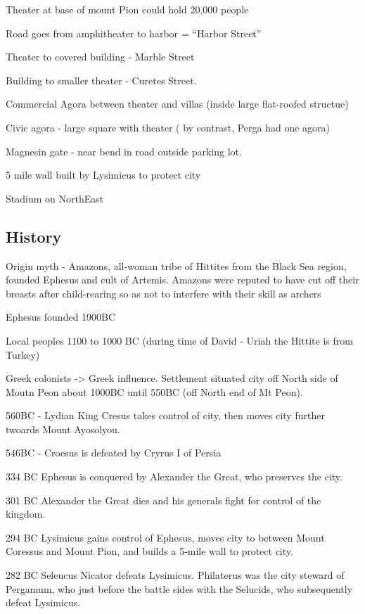 \documentclass[
]{book}
\begin{document}
Theater at base of mount Pion could hold 20,000 people

Road goes from amphitheater to harbor = ``Harbor Street''

Theater to covered building - Marble Street

Building to smaller theater - Curetes Street.

Commercial Agora between theater and villas (inside large flat-roofed structue)

Civic agora - large square with theater ( by contrast, Perga had one agora)

Magnesin gate - near bend in road outside parking lot.

5 mile wall built by Lysimicus to protect city

Stadium on NorthEast

\hypertarget{history-7}{%
\subsection{History}\label{history-7}}

Origin myth - Amazons, all-woman tribe of Hittites from the Black Sea region, founded Ephesus and cult of Artemis. Amazons were reputed to have cut off their breasts after child-rearing so as not to interfere with their skill as archers

Ephesus founded 1900BC

Local peoples 1100 to 1000 BC (during time of David - Uriah the Hittite is from Turkey)

Greek colonists -\textgreater{} Greek influence. Settlement situated city off North side of Moutn Peon about 1000BC until 550BC (off North end of Mt Peon).

560BC - Lydian King Cresus takes control of city, then moves city further twoards Mount Ayosolyou.

546BC - Croesus is defeated by Cryrus I of Persia

334 BC Ephesus is conquered by Alexander the Great, who preserves the city.

301 BC Alexander the Great dies and his generals fight for control of the kingdom.

294 BC Lysimicus gains control of Ephesus, moves city to between Mount Coressus and Mount Pion, and builds a 5-mile wall to protect city.

282 BC Seleucus Nicator defeats Lysimicus. Philaterus was the city steward of Pergamum, who just before the battle sides with the Selucids, who subsequently defeat Lysimicus.
\end{document}
